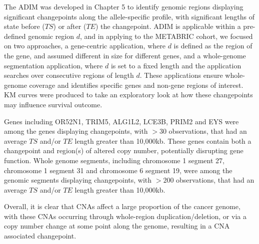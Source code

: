The ADIM was developed in Chapter 5 to identify genomic regions displaying significant changepoints along the allele-specific profile, with significant lengths of state before ($TS$) or after ($TE$) the changepoint. ADIM is applicable within a pre-defined genomic region $d$, and in applying to the METABRIC cohort, we focused on two approaches, a gene-centric application, where $d$ is defined as the region of the gene, and assumed different in size for different genes, and a whole-genome segmentation application, where  $d$ is set to a fixed length and the application searches over consecutive regions of length $d$. These applications ensure whole-genome coverage and identifies specific genes and non-gene regions of interest. KM curves were produced to take an exploratory look at how these changepoints may influence survival outcome. 

Genes including OR52N1, TRIM5, ALG1L2, LCE3B, PRIM2 and EYS were among the genes displaying changepoints, with $>30$ observations, that had an average $TS$ and/or $TE$ length greater than 10,000kb. These genes contain both a changepoint and region(s) of altered copy number, potentially disrupting gene function. Whole genome segments, including chromosome 1 segment 27, chromosome 1 segment 31 and chromosome 6 segment 19, were among the genomic segments displaying changepoints, with $>200$ observations, that had an average $TS$ and/or $TE$ length greater than 10,000kb.

Overall, it is clear that CNAs affect a large proportion of the cancer genome, with these CNAs occurring through whole-region duplication/deletion, or via a copy number change at some point along the genome, resulting in a CNA associated changepoint. 